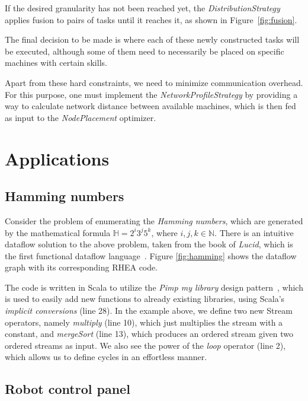 \documentclass[sigplan,review,anonymous,screen]{acmart}
\begin{document}
If the desired granularity has not been reached yet, the
\textit{DistributionStrategy} applies fusion to pairs of tasks until it reaches
it, as shown in Figure~\ref{fig:fusion}.


The final decision to be made is where each of these newly constructed tasks
will be executed, although some of them need to necessarily be placed on
specific machines with certain skills.

Apart from these hard constraints, we need to minimize communication overhead.
For this purpose, one must implement the \textit{NetworkProfileStrategy} by providing
a way to calculate network distance between available machines, which is then fed as input
to the \textit{NodePlacement} optimizer.

\section{Applications} \label{sec:applications}

\subsection{Hamming numbers}

Consider the problem of enumerating the
\textit{Hamming numbers}, which are generated by the mathematical formula
$\mathbb{H} = 2^i3^j5^k$, where $i,j,k \in \mathbb{N}$. There is an intuitive
dataflow solution to the above problem, taken from the book of \textit{Lucid},
which is the first functional dataflow language~\cite{lucid}. Figure
\ref{fig:hamming} shows the dataflow graph with its corresponding \textsc{RHEA}
code.


The code is written in Scala to utilize the \textit{Pimp my library} design
pattern~\cite{pimp}, which is used to easily add new functions to already
existing libraries, using Scala's \textit{implicit conversions} (line 28). In
the example above, we define two new Stream operators, namely \textit{multiply}
(line 10), which just multiplies the stream with a constant, and
\textit{mergeSort} (line 13), which produces an ordered stream given two ordered
streams as input. We also see the power of the \textit{loop} operator (line 2),
which allows us to define cycles in an effortless manner.

\subsection{Robot control panel}
\end{document}

